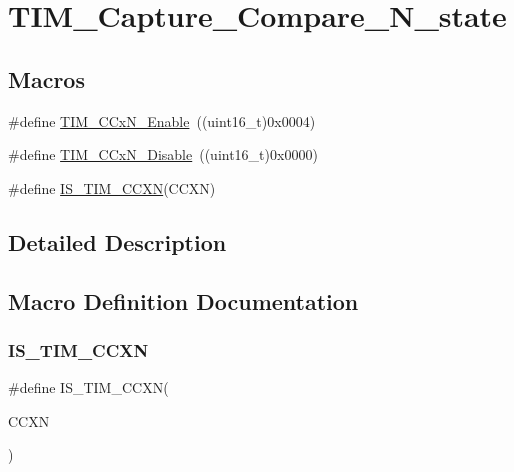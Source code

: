 \hypertarget{group___t_i_m___capture___compare___n__state}{}\section{T\+I\+M\+\_\+\+Capture\+\_\+\+Compare\+\_\+\+N\+\_\+state}
\label{group___t_i_m___capture___compare___n__state}
\subsection*{Macros}
\begin{DoxyCompactItemize}
\item 
\#define \mbox{\hyperlink{group___t_i_m___capture___compare___n__state_gab534ddf23d317eb912564292c1cede2d}{T\+I\+M\+\_\+\+C\+Cx\+N\+\_\+\+Enable}}~((uint16\+\_\+t)0x0004)
\item 
\#define \mbox{\hyperlink{group___t_i_m___capture___compare___n__state_ga0d7d46aeba33ed197aa39775bc527d7d}{T\+I\+M\+\_\+\+C\+Cx\+N\+\_\+\+Disable}}~((uint16\+\_\+t)0x0000)
\item 
\#define \mbox{\hyperlink{group___t_i_m___capture___compare___n__state_gad5a9f961e44c8d7c24066ac37ec79cbc}{I\+S\+\_\+\+T\+I\+M\+\_\+\+C\+C\+XN}}(C\+C\+XN)
\end{DoxyCompactItemize}


\subsection{Detailed Description}


\subsection{Macro Definition Documentation}
\mbox{\label{group___t_i_m___capture___compare___n__state_gad5a9f961e44c8d7c24066ac37ec79cbc}} 
\subsubsection{\texorpdfstring{IS\_TIM\_CCXN}{IS\_TIM\_CCXN}}
{\footnotesize\ttfamily \#define I\+S\+\_\+\+T\+I\+M\+\_\+\+C\+C\+XN(\begin{DoxyParamCaption}\item[{}]{C\+C\+XN }\end{DoxyParamCaption})}

